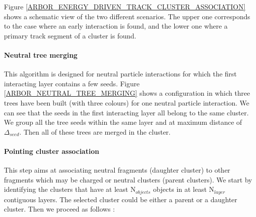 \documentclass[cits]{JINST}
\begin{document}
Figure \ref{ARBOR_ENERGY_DRIVEN_TRACK_CLUSTER_ASSOCIATION} shows a schematic view of the two different scenarios. The upper one corresponds to the case where an early interaction is found, and the lower one where a primary track segment of a cluster is found.

\paragraph*{Neutral tree merging} This algorithm is designed for neutral particle interactions for which the first interacting layer contains a few seeds. Figure \ref{ARBOR_NEUTRAL_TREE_MERGING} shows a configuration in which three trees have been built (with three colours) for one neutral particle interaction. We can see that the seeds in the first interacting layer all belong to the same cluster. We group all the tree seeds within the same layer and at maximum distance of $\Delta_{seed}$. Then all of these trees are merged in the cluster.

\paragraph*{Pointing cluster association} This step aims at associating neutral fragments (daughter cluster) to other fragments which may be charged or neutral clusters (parent clusters). We start by identifying the clusters that have at least N$_{objects}$ objects in at least N$_{layer}$ contiguous layers. The selected cluster could be either a parent or a daughter cluster. Then we proceed as follows :
\end{document}
